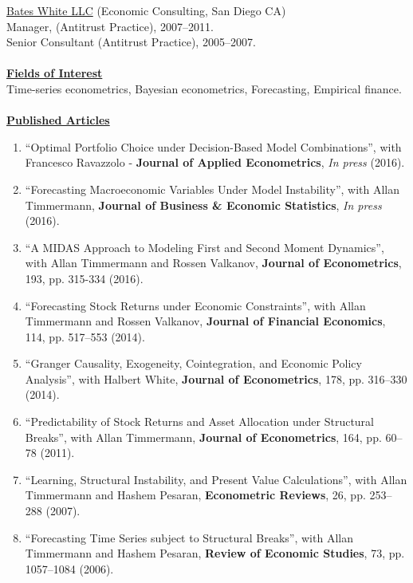\documentclass[12pt]{article}
\begin{document}
\underline{Bates White LLC} (Economic Consulting, San Diego CA)\\
Manager, (Antitrust Practice), 2007--2011.\\
Senior Consultant (Antitrust Practice), 2005--2007. \\ \\
\underline{\textbf{Fields of Interest}}\\
Time-series econometrics, Bayesian econometrics, Forecasting, Empirical finance.\\ \\
\underline{\textbf{Published Articles}}
\begin{enumerate}	

	\item ``Optimal Portfolio Choice under Decision-Based Model Combinations'', with Francesco Ravazzolo - \textbf{Journal of Applied Econometrics}, \textit{In press} (2016).
	  \item ``Forecasting Macroeconomic Variables Under Model Instability'', with Allan Timmermann, \textbf{Journal of Business \& Economic Statistics},  \textit{In press} (2016). 
	\item ``A MIDAS Approach to Modeling First and Second Moment Dynamics'', with Allan Timmermann and Rossen Valkanov, \textbf{Journal of Econometrics}, 193, pp. 315-334 (2016).
	\item ``Forecasting Stock Returns under Economic Constraints'', with Allan Timmermann and Rossen Valkanov, \textbf{Journal of Financial Economics}, 114, pp. 517--553 (2014). 
	\item ``Granger Causality, Exogeneity, Cointegration, and Economic Policy Analysis'', with Halbert White, \textbf{Journal of Econometrics}, 178, pp. 316--330 (2014). 
	\item ``Predictability of Stock Returns and Asset Allocation under Structural Breaks'', with Allan Timmermann, \textbf{Journal of Econometrics}, 164, pp. 60--78 (2011). 
	\item ``Learning, Structural Instability, and Present Value Calculations'', with Allan Timmermann and Hashem Pesaran, \textbf{Econometric Reviews}, 26, pp. 253--288 (2007). 
	\item ``Forecasting Time Series subject to Structural Breaks'', with Allan Timmermann and Hashem Pesaran, \textbf{Review of Economic Studies}, 73, pp. 1057--1084 (2006). 

    \setcounter{enumTemp}{\theenumi}
 \end{enumerate}
\end{document}
